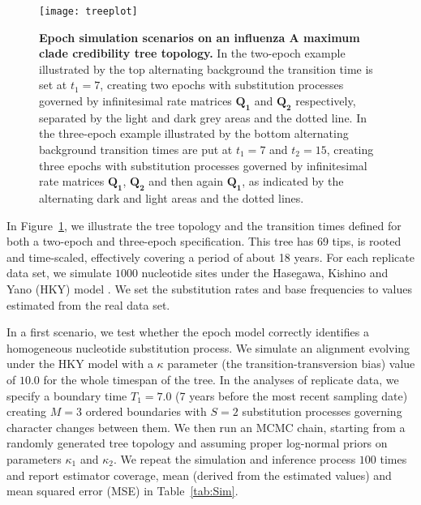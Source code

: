 \begin{figure}[h!]
\centering
\texttt{[image: treeplot]} 
\caption{
{ \footnotesize 
{\bf  Epoch simulation scenarios on an influenza A maximum clade credibility tree topology.} 
In the two-epoch example illustrated by the top alternating background
the transition time is set at $t_{1}=7$, creating two epochs with substitution processes governed by infinitesimal rate matrices $\mathbf{Q_{1}}$ and $\mathbf{Q_{2}}$ respectively, separated by the light and dark grey areas and the dotted line.
In the three-epoch example illustrated 
by the bottom alternating background
transition times are put at $t_{1}=7$ and $t_{2}=15$, creating three epochs with substitution processes governed by infinitesimal rate matrices $\mathbf{Q_{1}}$, $\mathbf{Q_{2}}$ and then again $\mathbf{Q_{1}}$, as indicated by the alternating dark and light areas and the dotted lines.
}%
}%
\label{fig:2RateTree}
\end{figure}

In Figure~\ref{fig:2RateTree}, we illustrate the tree topology and the transition times defined for both a two-epoch and three-epoch specification.
This tree has 69 tips, is rooted and time-scaled, effectively covering a period of about 18 years. 
For each replicate data set, we simulate $1000$ nucleotide sites under the Hasegawa, Kishino and Yano (HKY) model \citep{hky85}. 
We set the substitution rates and base frequencies to values estimated from the real data set.

In a first scenario, we test whether the epoch model correctly identifies a homogeneous nucleotide substitution process. 
We simulate an alignment evolving under the HKY model with a $\kappa$ parameter (the transition-transversion bias) value of $10.0$ for the whole timespan of the tree. 
In the analyses of replicate data, we specify a boundary time $T_1=7.0$ (7 years before the most recent sampling date) creating $M=3$ ordered boundaries with $S=2$ substitution processes governing character changes between them.
We then run an MCMC chain, starting from a randomly generated tree topology and assuming proper log-normal priors on parameters $\kappa_{1}$ and $\kappa_{2}$.
We repeat the simulation and inference process $100$ times and report estimator coverage, mean (derived from the estimated values) and mean squared error (MSE) in Table~\ref{tab:Sim}.

